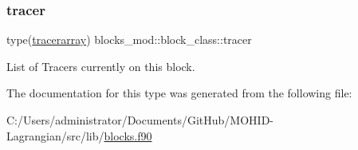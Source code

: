 \subsubsection{\texorpdfstring{tracer}{tracer}}
{\footnotesize\ttfamily type(\hyperlink{structtracer__array__mod_1_1tracerarray}{tracerarray}) blocks\+\_\+mod\+::block\+\_\+class\+::tracer\hspace{0.3cm}{\ttfamily [private]}}



List of Tracers currently on this block. 



The documentation for this type was generated from the following file\+:\begin{DoxyCompactItemize}
\item 
C\+:/\+Users/administrator/\+Documents/\+Git\+Hub/\+M\+O\+H\+I\+D-\/\+Lagrangian/src/lib/\hyperlink{blocks_8f90}{blocks.\+f90}\end{DoxyCompactItemize}
